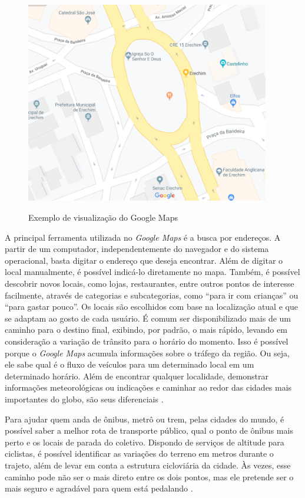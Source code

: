 \begin{figure}[H]
    \centering
    \caption{Exemplo de visualização do Google Maps}
    \includegraphics[width=0.95\textwidth]{./dados/figuras/fig4}
    \label{fig:figura-googlemaps}
\end{figure}

A principal ferramenta utilizada no \textit{Google Maps} é a busca por endereços. A partir de um computador, independentemente do navegador e do sistema operacional, basta digitar o endereço que deseja encontrar. Além de digitar o local manualmente, é possível indicá-lo diretamente no mapa. Também, é possível descobrir novos locais, como lojas, restaurantes, entre outros pontos de interesse facilmente, através de categorias e subcategorias, como “para ir com crianças” ou “para gastar pouco”. Os locais são escolhidos com base na localização atual e que se adaptam ao gosto de cada usuário. É comum ser disponibilizado mais de um caminho para o destino final, exibindo, por padrão, o mais rápido, levando em consideração a variação de trânsito para o horário do momento. Isso é possível porque o \textit{Google Maps} acumula informações sobre o tráfego da região. Ou seja, ele sabe qual é o fluxo de veículos para um determinado local em um determinado horário. Além de encontrar qualquer localidade, demonstrar informações meteorológicas ou indicações e caminhar ao redor das cidades mais importantes do globo, são seus diferenciais \cite{google:2019}.

\newpage
Para ajudar quem anda de ônibus, metrô ou trem, pelas cidades do mundo, é possível saber a melhor rota de transporte público, qual o ponto de ônibus mais perto e os locais de parada do coletivo. Dispondo de serviços de altitude para ciclistas, é possível identificar as variações do terreno em metros durante o trajeto, além de levar em conta a estrutura cicloviária da cidade. Às vezes, esse caminho pode não ser o mais direto entre os dois pontos, mas ele pretende ser o mais seguro e agradável para quem está pedalando \cite{google:2019}.

